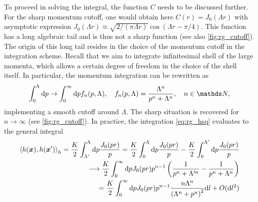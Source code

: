 To proceed in solving the integral, the function $C$ needs to be discussed further.
For the sharp momentum cutoff, one would obtain here $C(r) = J_0(\Lambda r)$ with asymptotic expression $J_0(\Lambda r)\approx\sqrt{2/(\pi \Lambda r)}\cos(\Lambda r-\pi/4)$.
This function has a long algebraic tail and is thus not a sharp function (see also \cref{fig:rg_cutoff}).
The origin of this long tail resides in the choice of the momentum cutoff in the integration scheme.
Recall that we aim to integrate infinitesimal shell of the large momenta, which allows a certain degree of freedom in the choice of the shell itself.
In particular, the momentum integration can be rewritten as
\begin{align}
    \int_{0}^{\Lambda}\rd p \rightarrow \int_{0}^\infty\rd p f_n(p,\Lambda),
    \quad
    f_n(p,\Lambda) = \frac{\Lambda^n}{p^n+\Lambda^n},
    \quad
    n\in\mathds N,
    \label{eq:integral_cutoff}
\end{align}
implementing a smooth cutoff around $\Lambda$.
The sharp situation is recovered for $n\rightarrow\infty$ (see \cref{fig:rg_cutoff}).
In practice, the integration \cref{eq:rg_hsq} evaluates to the general integral
\begin{align}
    \braket{h({\bm x}),h(\bm x')}_h = \frac K2\int_{\Lambda'}^\Lambda\mathrm d p\frac{J_0(p r)}{p} = \frac K2\int_{0}^\Lambda\mathrm d p\frac{J_0(p r)}{p}
    -\frac K2\int_{0}^{\Lambda'}\mathrm d p\frac{J_0(p r)}{p}
    \\
    \longrightarrow
    \frac K2\int_{0}^\infty\mathrm d p J_0(p r)p^{n-1}\left( \frac1{p^n+\Lambda'^n}-\frac1{p^n+\Lambda^n} \right)
    \\
    =
    \frac K2\int_{0}^\infty\mathrm d p J_0(p r)p^{n-1}\frac{n\Lambda^n}{\left(\Lambda^n+p^n\right)^2}\mathrm d l + O(\mathrm d l^2)
    \label{eq:rg_hxhxpr}
\end{align}
